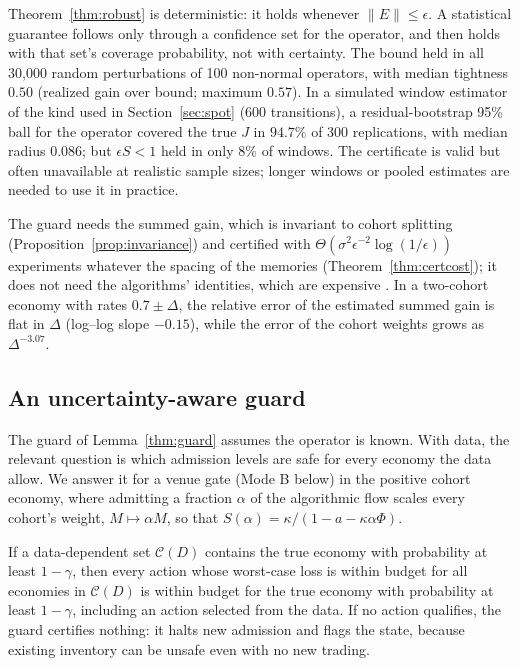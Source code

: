 Theorem~\ref{thm:robust} is deterministic: it holds whenever $\|E\|\le\epsilon$. A statistical guarantee follows only through a confidence set for the operator, and then holds with that set's coverage probability, not with certainty. The bound held in all 30,000 random perturbations of 100 non-normal operators, with median tightness $0.50$ (realized gain over bound; maximum $0.57$). In a simulated window estimator of the kind used in Section~\ref{sec:spot} (600 transitions), a residual-bootstrap 95\% ball for the operator covered the true $J$ in $94.7\%$ of 300 replications, with median radius $0.086$; but $\epsilon S<1$ held in only $8\%$ of windows. The certificate is valid but often unavailable at realistic sample sizes; longer windows or pooled estimates are needed to use it in practice.

The guard needs the summed gain, which is invariant to cohort splitting (Proposition~\ref{prop:invariance}) and certified with $\Theta(\sigma^2\epsilon^{-2}\log(1/\epsilon))$ experiments whatever the spacing of the memories (Theorem~\ref{thm:certcost}); it does not need the algorithms' identities, which are expensive \citep{niroula2026}. In a two-cohort economy with rates $0.7\pm\Delta$, the relative error of the estimated summed gain is flat in $\Delta$ (log--log slope $-0.15$), while the error of the cohort weights grows as $\Delta^{-3.07}$.


\subsection{An uncertainty-aware guard}\label{sec:robustguard}
The guard of Lemma~\ref{thm:guard} assumes the operator is known. With data, the relevant question is which admission levels are safe for every economy the data allow. We answer it for a venue gate (Mode B below) in the positive cohort economy, where admitting a fraction $\alpha$ of the algorithmic flow scales every cohort's weight, $M\mapsto\alpha M$, so that $S(\alpha)=\kappa/(1-a-\kappa\alpha\Phi)$.

\begin{lemma}\label{lem:sound}
If a data-dependent set $\mathcal C(D)$ contains the true economy with probability at least $1-\gamma$, then every action whose worst-case loss is within budget for all economies in $\mathcal C(D)$ is within budget for the true economy with probability at least $1-\gamma$, including an action selected from the data. If no action qualifies, the guard certifies nothing: it halts new admission and flags the state, because existing inventory can be unsafe even with no new trading.
\end{lemma}

